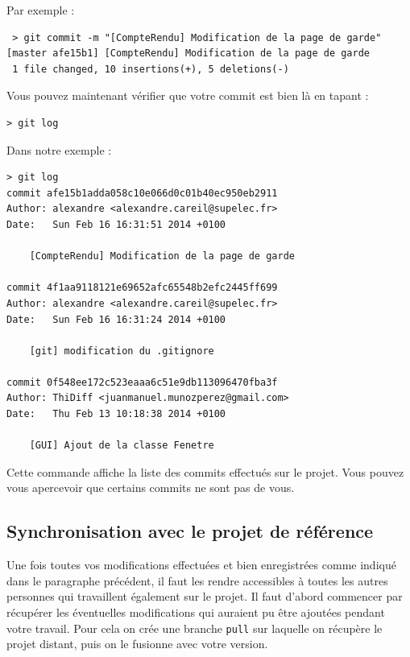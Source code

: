 \par Par exemple :
\begin{verbatim}
 > git commit -m "[CompteRendu] Modification de la page de garde"
[master afe15b1] [CompteRendu] Modification de la page de garde
 1 file changed, 10 insertions(+), 5 deletions(-)
\end{verbatim}

\par Vous pouvez maintenant vérifier que votre commit est bien là en tapant :
\begin{verbatim}
> git log
\end{verbatim}

\par Dans notre exemple :

\begin{verbatim}
> git log
commit afe15b1adda058c10e066d0c01b40ec950eb2911
Author: alexandre <alexandre.careil@supelec.fr>
Date:   Sun Feb 16 16:31:51 2014 +0100

    [CompteRendu] Modification de la page de garde

commit 4f1aa9118121e69652afc65548b2efc2445ff699
Author: alexandre <alexandre.careil@supelec.fr>
Date:   Sun Feb 16 16:31:24 2014 +0100

    [git] modification du .gitignore

commit 0f548ee172c523eaaa6c51e9db113096470fba3f
Author: ThiDiff <juanmanuel.munozperez@gmail.com>
Date:   Thu Feb 13 10:18:38 2014 +0100

    [GUI] Ajout de la classe Fenetre
\end{verbatim}


\par Cette commande affiche la liste des commits effectués sur le projet. Vous pouvez vous apercevoir que certains commits ne sont pas de vous.

\subsection{Synchronisation avec le projet de référence}
\label{sec:synchr-avec-le}

\par Une fois toutes vos modifications effectuées et bien enregistrées comme indiqué dans le paragraphe précédent, il faut les rendre accessibles à toutes les autres personnes qui travaillent également sur le projet. Il faut d'abord commencer par récupérer les éventuelles modifications qui auraient pu être ajoutées pendant votre travail. Pour cela on crée une branche \texttt{pull} sur laquelle on récupère le projet distant, puis on le fusionne avec votre version.

